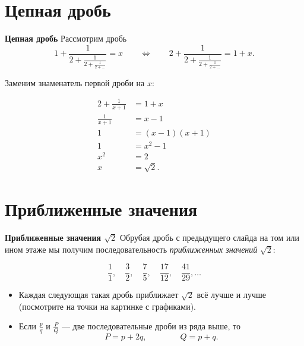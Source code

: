 \documentclass[11pt]{beamer}
\newcommand\fram[2]{\begin{frame}{\bf #1} #2 \end{frame}}
\begin{document}
\section{Цепная дробь}
\fram{Цепная дробь}{
Рассмотрим дробь
$$1+\frac{1}{2+\frac{1}{2+\frac{1}{2+\ldots}}} = x \qquad \Longleftrightarrow \qquad 2+\frac{1}{\boxed{2+\frac{1}{2+\frac{1}{2+\ldots}}}} = 1+x.$$\vspace{-4mm}

Заменим знаменатель первой дроби на $x$:\vspace{-5mm}

\begin{align*}
    2 + \frac{1}{x+1} &= 1+x\\
    \frac{1}{x+1} &= x-1\\
    1 &= (x-1)(x+1)\\
    1 &= x^2 - 1\\
    x^2 &= 2\\
    x &= \sqrt{2}.
\end{align*}
}

\section{Приближенные значения}
\fram{Приближенные значения $\sqrt{2}$}{
Обрубая дробь с предыдущего слайда на том или ином этаже мы получим последовательность \textit{приближенных значений} $\sqrt{2}$:

$$\frac{1}{1}, \quad \frac{3}{2}, \quad \frac{7}{5}, \quad \frac{17}{12}, \quad \frac{41}{29}, \ldots$$

\begin{itemize}
    \item Каждая следующая такая дробь приближает $\sqrt{2}$ всё лучше и лучше (посмотрите на точки на картинке с графиками).
    \item Если $\frac{p}{q}$ и $\frac{P}{Q}$ --- две последовательные дроби из ряда выше, то
    $$P = p+2q, \qquad\qquad Q = p+q.$$
\end{itemize}
}
\end{document}

